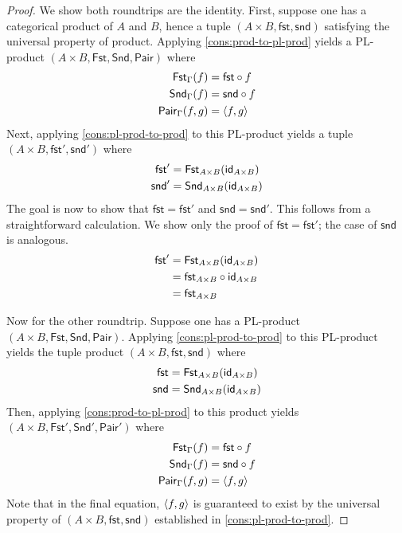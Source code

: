 \begin{proof}
  We show both roundtrips are the identity.
  First, suppose one has a categorical product of \(A\) and \(B\),
  hence a tuple \((A \times B, \mathsf{fst},\mathsf{snd})\)
  satisfying the universal property of product.
  Applying \cref{cons:prod-to-pl-prod}
  yields a PL-product \((A\times B,\mathsf{Fst},\mathsf{Snd},\mathsf{Pair})\)
  where
  \begin{align*}
    \mathsf{Fst}_\Gamma(f) &= \mathsf{fst} \circ f \\
    \mathsf{Snd}_\Gamma(f) &= \mathsf{snd} \circ f \\
    \mathsf{Pair}_\Gamma(f,g) &= \langle f,g\rangle
  \end{align*}
  Next, applying \cref{cons:pl-prod-to-prod} to this PL-product
  yields a tuple \((A\times B, \mathsf{fst}',\mathsf{snd}')\)
  where
  \begin{align*}
    \mathsf{fst}' &= \mathsf{Fst}_{A\times B}(\mathsf{id}_{A \times B}) \\
    \mathsf{snd}' &= \mathsf{Snd}_{A\times B}(\mathsf{id}_{A \times B})
  \end{align*}
  The goal is now to show that
  \(\mathsf{fst} = \mathsf{fst}'\)
  and
  \(\mathsf{snd} = \mathsf{snd}'\).
  This follows from a straightforward calculation. We show only the proof of \(\mathsf{fst} = \mathsf{fst}'\);
  the case of \(\mathsf{snd}\) is analogous.
  \begin{align*}
    \mathsf{fst}' &= \mathsf{Fst}_{A\times B}(\mathsf{id}_{A \times B}) \\
     &= \mathsf{fst}_{A\times B}\circ \mathsf{id}_{A \times B} \\
     &= \mathsf{fst}_{A\times B}
  \end{align*}

  Now for the other roundtrip. Suppose one has a PL-product \((A \times B,  \mathsf{Fst},\mathsf{Snd},\mathsf{Pair})\).
  Applying \cref{cons:pl-prod-to-prod} to this PL-product yields the tuple product \((A\times B,\mathsf{fst},\mathsf{snd})\)
  where
  \begin{align*}
    \mathsf{fst} &= \mathsf{Fst}_{A\times B}(\mathsf{id}_{A \times B}) \\
    \mathsf{snd} &= \mathsf{Snd}_{A\times B}(\mathsf{id}_{A \times B})
  \end{align*}
  Then, applying \cref{cons:prod-to-pl-prod} to this product yields
  \((A\times B, \mathsf{Fst}',\mathsf{Snd}',\mathsf{Pair}')\)
  where
  \begin{align*}
    \mathsf{Fst}_\Gamma(f) &= \mathsf{fst} \circ f \\
    \mathsf{Snd}_\Gamma(f) &= \mathsf{snd} \circ f \\
    \mathsf{Pair}_\Gamma(f,g) &= \langle f,g\rangle
  \end{align*}
  Note that in the final equation, \(\langle f,g\rangle\) is guaranteed to exist by the universal property
  of \((A\times B,\mathsf{fst},\mathsf{snd})\) established in \cref{cons:pl-prod-to-prod}.


\end{proof}

